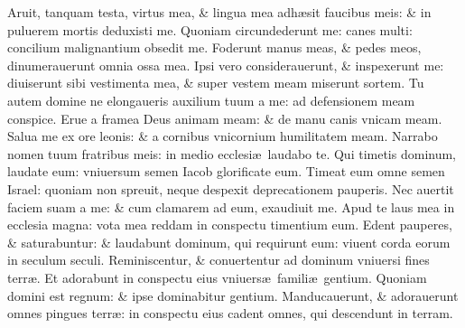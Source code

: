\documentclass[a5paper,10pt]{book}
\def\ae{æ}
\begin{document}
\begin{multicols*}{2}
\newline \color{red} A\color{black}ruit, tanquam testa, virtus mea, \& lingua mea adh\ae sit faucibus meis: \& in puluerem mortis deduxisti me.
\newline \color{red} Q\color{black}uoniam circundederunt me: canes multi: concilium malignantium obsedit me.
\newline \color{red} F\color{black}oderunt manus meas, \& pedes meos, dinumerauerunt omnia ossa mea.
\newline \color{red} I\color{black}psi vero considerauerunt, \& inspexerunt me: diuiserunt sibi vestimenta mea, \& super vestem meam miserunt sortem.
\newline \color{red} T\color{black}u autem domine ne elongaueris auxilium tuum a me: ad defensionem meam conspice.
\newline \color{red} E\color{black}rue a framea Deus animam meam: \& de manu canis vnicam meam.
\newline \color{red} S\color{black}alua me ex ore leonis: \& a cornibus vnicornium humilitatem meam.
\newline \color{red} N\color{black}arrabo nomen tuum fratribus meis: in medio ecclesi\ae \ laudabo te.
\newline \color{red} Q\color{black}ui timetis dominum, laudate eum: vniuersum semen Iacob glorificate eum.
\newline \color{red} T\color{black}imeat eum omne semen Israel: quoniam non spreuit, neque despexit deprecationem pauperis.
\newline \color{red} N\color{black}ec auertit faciem suam a me: \& cum clamarem ad eum, exaudiuit me.
\newline \color{red} A\color{black}pud te laus mea in ecclesia magna: vota mea reddam in conspectu timentium eum.
\newline \color{red} E\color{black}dent pauperes, \& saturabuntur: \& laudabunt dominum, qui requirunt eum: viuent corda eorum in seculum seculi.
\newline \color{red} R\color{black}eminiscentur, \& conuertentur ad dominum vniuersi fines terr\ae .
\newline \color{red} E\color{black}t adorabunt in conspectu eius vniuers\ae \ famili\ae \ gentium.
\newline \color{red} Q\color{black}uoniam domini est regnum: \& ipse dominabitur gentium.
\newline \color{red} M\color{black}anducauerunt, \& adorauerunt omnes pingues terr\ae : in conspectu eius cadent omnes, qui descendunt in terram.

\end{multicols*}
\end{document}

